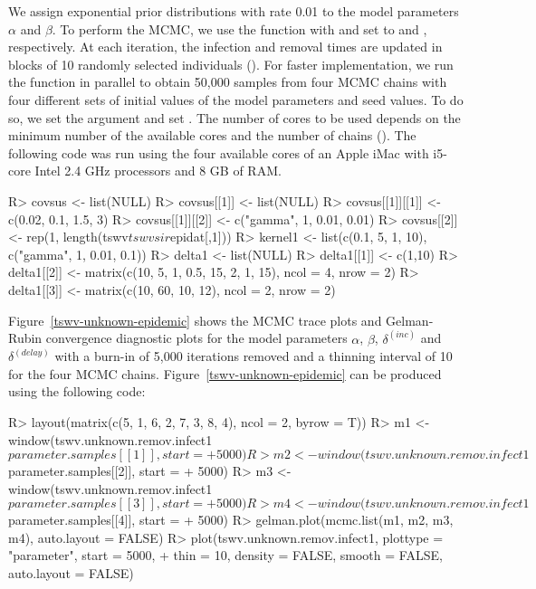 \documentclass[nojss,shortnames]{jss}
\begin{document}
We assign exponential prior distributions with rate 0.01 to the model parameters $\alpha$ and $\beta$. To perform the MCMC, we use the  function with  and  set to  and , respectively. At each iteration, the infection and removal times are updated in blocks of 10 randomly selected individuals (). 
For faster implementation, we run the  function in parallel to obtain 50,000 samples from four MCMC chains with four different sets of initial values of the model parameters and seed values. To do so, we set the argument  and set . The number of cores to be used depends on the minimum number of the available cores and the number of chains (). The following code was run using the four available cores of an Apple iMac with i5-core Intel 2.4 GHz processors and 8 GB of RAM.

\begin{Sinput}
R> covsus <- list(NULL)
R> covsus[[1]] <- list(NULL)
R> covsus[[1]][[1]] <- c(0.02, 0.1, 1.5, 3)
R> covsus[[1]][[2]] <- c("gamma", 1, 0.01, 0.01)
R> covsus[[2]] <- rep(1, length(tswv$tswvsir$epidat[,1]))
R> kernel1 <- list(c(0.1, 5, 1, 10), c("gamma", 1, 0.01, 0.1))
R> delta1 <- list(NULL)
R> delta1[[1]] <- c(1,10)
R> delta1[[2]] <- matrix(c(10, 5, 1, 0.5, 15, 2, 1, 15), ncol = 4, nrow = 2)
R> delta1[[3]] <- matrix(c(10, 60, 10, 12), ncol = 2, nrow = 2)
\end{Sinput}


Figure~\ref{tswv-unknown-epidemic} shows the MCMC trace plots and Gelman-Rubin convergence diagnostic plots for the model parameters $\alpha$, $\beta$, $\delta^{(inc)}$ and $\delta^{(delay)}$ with a burn-in of 5,000 iterations removed and a thinning interval of 10 for the four MCMC chains. Figure~\ref{tswv-unknown-epidemic} can be produced using the following code:
\begin{Sinput}
R> layout(matrix(c(5, 1, 6, 2, 7, 3, 8, 4), ncol = 2, byrow = T))
R> m1 <- window(tswv.unknown.remov.infect1$parameter.samples[[1]], start = 
+    5000)
R> m2 <- window(tswv.unknown.remov.infect1$parameter.samples[[2]], start = 
+    5000)
R> m3 <- window(tswv.unknown.remov.infect1$parameter.samples[[3]], start = 
+    5000)
R> m4 <- window(tswv.unknown.remov.infect1$parameter.samples[[4]], start = 
+    5000)
R> gelman.plot(mcmc.list(m1, m2, m3, m4), auto.layout = FALSE)
R> plot(tswv.unknown.remov.infect1, plottype = "parameter", start = 5000, 
+    thin = 10, density = FALSE, smooth = FALSE, auto.layout = FALSE)
\end{Sinput}
\end{document}
